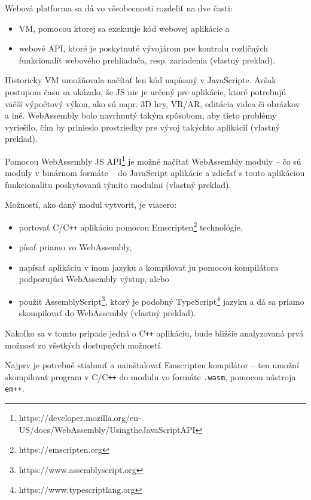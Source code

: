 Webová platforma sa dá vo všeobecnosti rozdeliť na dve časti:
\begin{itemize}
\item {VM, pomocou ktorej sa exekuuje kód webovej aplikácie a}
\item {webové API, ktoré je poskytnuté vývojárom pre kontrolu rozličných funkcionalít webového prehliadača, resp. zariadenia  \cite{webassembly_concepts} (vlastný preklad).}
\end{itemize}

Historicky VM umožňovala načítať len kód napísaný v JavaScripte. Avšak postupom času sa ukázalo, že JS nie je určený pre aplikácie, ktoré potrebujú väčší výpočtový výkon, ako sú napr. 3D hry, VR/AR, editácia videa či obrázkov a iné.
WebAssembly bolo navrhnutý takým spôsobom, aby tieto problémy vyriešilo, čím by prinieslo prostriedky pre vývoj takýchto aplikácií \cite{webassembly_concepts} (vlastný preklad). 

Pomocou WebAssembly JS API\footnote{https://developer.mozilla.org/en-US/docs/WebAssembly/Using\textunderscore the\textunderscore JavaScript\textunderscore API} je možné načítať WebAssembly moduly -- čo sú moduly v binárnom formáte -- do JavaScript aplikácie a zdieľať s touto aplikáciou funkcionalitu poskytovanú týmito modulmi \cite{webassembly_concepts} (vlastný preklad).

Možností, ako daný modul vytvoriť, je viacero:
\begin {itemize}
\item {portovať C/C\texttt{++} aplikáciu pomocou Emscripten\footnote{https://emscripten.org} technológie,}
\item {písať priamo vo WebAssembly,}
\item {napísať aplikáciu v inom jazyku a kompilovať ju pomocou kompilátora podporujúci WebAssembly výstup, alebo}
\item {použiť AssemblyScript\footnote{https://www.assemblyscript.org}, ktorý je podobný TypeScript\footnote{https://www.typescriptlang.org} jazyku a dá sa priamo skompilovať do WebAssembly \cite{webassembly_concepts} (vlastný preklad).}
\end {itemize}

Nakoľko sa v tomto prípade jedná o C\texttt{++} aplikáciu, bude bližšie analyzovaná prvá možnosť zo všetkých dostupných možností.

Najprv je potrebné stiahnuť a nainštalovať Emscripten kompilátor -- ten umožní skompilovať program v C/C\texttt{++} do modulu vo formáte \texttt{.wasm}, pomocou nástroja \texttt{em++}.


